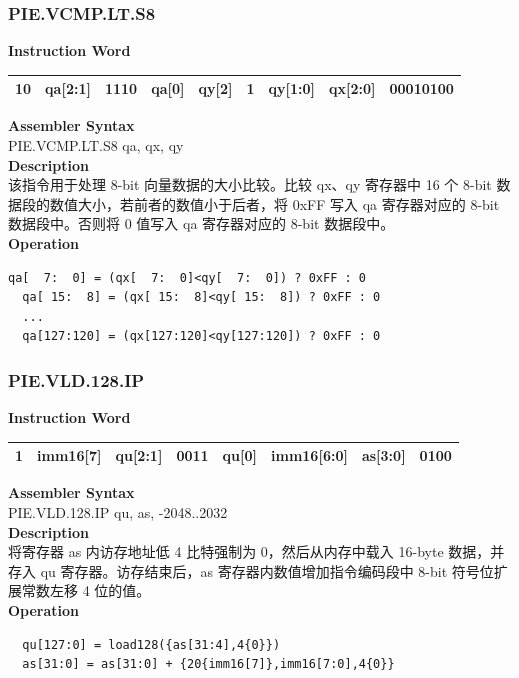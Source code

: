 \newpage
\subsubsection{PIE.VCMP.LT.S8}\label{instruction:PIEVCMPLTS8}
\setlength\tabcolsep{6pt}
\textbf{Instruction Word} \\
\begin{tabular}{|c|c|c|c|c|c|c|c|c|}
	\hline
	10 & qa[2:1] & 1110 & qa[0] & qy[2] & 1 & qy[1:0] & qx[2:0] & 00010100 \\
	\hline
\end{tabular}

\textbf{Assembler Syntax} \\
PIE.VCMP.LT.S8 qa, qx, qy \\
\textbf{Description} \\
该指令用于处理 8-bit 向量数据的大小比较。比较 qx、qy 寄存器中 16 个 8-bit 数据段的数值大小，若前者的数值小于后者，将 0xFF 写入 qa 寄存器对应的 8-bit 数据段中。否则将 0 值写入 qa 寄存器对应的 8-bit 数据段中。\\
\textbf{Operation}
\begin{lstlisting}[escapeinside=`?]
  qa[  7:  0] = (qx[  7:  0]<qy[  7:  0]) ? 0xFF : 0
  qa[ 15:  8] = (qx[ 15:  8]<qy[ 15:  8]) ? 0xFF : 0
  ...
  qa[127:120] = (qx[127:120]<qy[127:120]) ? 0xFF : 0
\end{lstlisting}

\newpage
\subsubsection{PIE.VLD.128.IP}\label{instruction:PIEVLD128IP}
\setlength\tabcolsep{6pt}
\textbf{Instruction Word} \\
\begin{tabular}{|c|c|c|c|c|c|c|c|}
	\hline
	1 & imm16[7] & qu[2:1] & 0011 & qu[0] & imm16[6:0] & as[3:0] & 0100 \\
	\hline
\end{tabular}

\textbf{Assembler Syntax} \\
PIE.VLD.128.IP qu, as, -2048..2032 \\
\textbf{Description} \\
将寄存器 as 内访存地址低 4 比特强制为 0，然后从内存中载入 16-byte 数据，并存入 qu 寄存器。访存结束后，as 寄存器内数值增加指令编码段中 8-bit 符号位扩展常数左移 4 位的值。\\
\textbf{Operation}
\begin{lstlisting}
  qu[127:0] = load128({as[31:4],4{0}})
  as[31:0] = as[31:0] + {20{imm16[7]},imm16[7:0],4{0}}
\end{lstlisting}

